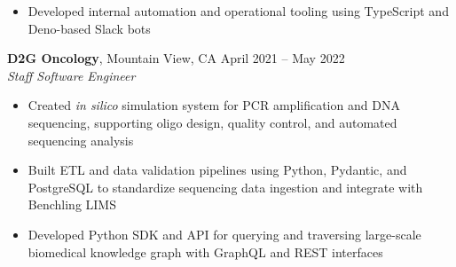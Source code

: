 \documentclass[margin,line]{resume}
\begin{document}
\begin{resume}
\begin{itemize}
    \item Developed internal automation and operational tooling using TypeScript and Deno-based Slack bots
    \end{itemize}

    \textbf{D2G Oncology}, Mountain View, CA \hfill\vspace{1mm}\hfill April 2021 -- May 2022\\%
    \textsl{Staff Software Engineer}
    \begin{itemize}
    \item Created \textit{in silico} simulation system for PCR amplification and DNA sequencing, supporting oligo design, quality control, and automated sequencing analysis
    \item Built ETL and data validation pipelines using Python, Pydantic, and PostgreSQL to standardize sequencing data ingestion and integrate with Benchling LIMS
    \item Developed Python SDK and API for querying and traversing large-scale biomedical knowledge graph with GraphQL and REST interfaces
    \end{itemize}


\end{resume}
\end{document}
